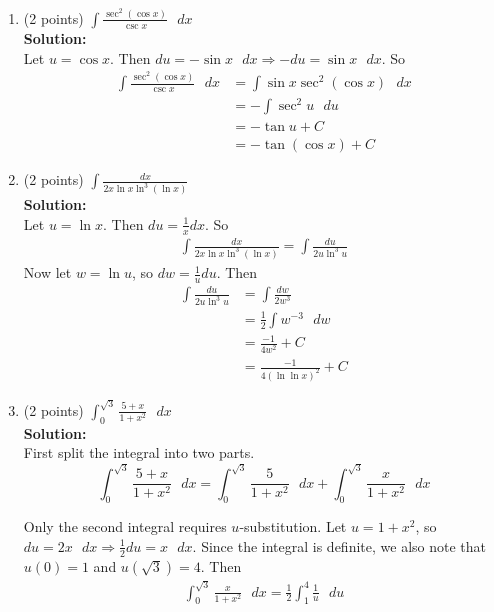 \documentclass[paper=a4, fontsize=11pt]{scrartcl} %
\numberwithin{equation}{section} %
\numberwithin{figure}{section} %
\numberwithin{table}{section} %
\begin{document}
\begin{enumerate}
\item (2 points) $\displaystyle \int \frac{\sec^2(\cos x)}{\csc x} \text{ } dx$\\
\noindent\textbf{Solution:}\\
Let $u = \cos x$.  Then $du = -\sin x \text{ } dx \Longrightarrow -du = \sin x \text{ } dx$.  So
\begin{align*}
\int \frac{\sec^2(\cos x)}{\csc x} \text{ } dx &= \int \sin x\sec^2(\cos x) \text{ } dx\\
&= - \int \sec^2 u \text{ } du\\
&= - \tan u + C\\
&= - \tan(\cos x) + C
\end{align*}
\vspace{1.5in}
\item (2 points) $\displaystyle \int \frac{dx}{2x\ln x \ln^3(\ln x)}$\\
\noindent\textbf{Solution:}\\
Let $u = \ln x$.  Then $du = \frac{1}{x}dx$.  So
\begin{align*}
\int \frac{dx}{2x\ln x \ln^3(\ln x)} = \int \frac{du}{2u\ln^3u}
\end{align*}
Now let $w = \ln u$, so $dw = \frac{1}{u}du$.  Then
\begin{align*}
\int \frac{du}{2u\ln^3u} &= \int \frac{dw}{2w^3}\\
&= \frac{1}{2}\int w^{-3} \text{ } dw\\
&= \frac{-1}{4w^2}+C\\
&= \frac{-1}{4(\ln \ln x)^2} + C
\end{align*}


\newpage

\item (2 points) $\displaystyle \int_0^{\sqrt{3}} \frac{5+x}{1+x^2} \text{ } dx$\\
\noindent\textbf{Solution:}\\
First split the integral into two parts.
\begin{equation*}
\int_0^{\sqrt{3}} \frac{5+x}{1+x^2} \text{ } dx = \int_0^{\sqrt{3}} \frac{5}{1+x^2} \text{ } dx + \int_0^{\sqrt{3}} \frac{x}{1+x^2} \text{ } dx
\end{equation*}

\noindent Only the second integral requires $u$-substitution.  Let $u = 1 + x^2$, so $du = 2x \text{ } dx \Longrightarrow \frac{1}{2}du = x \text{ } dx$.  Since the integral is definite, we also note that $u(0) = 1$ and $u(\sqrt{3}) = 4$. Then
\begin{align*}
\int_0^{\sqrt{3}} \frac{x}{1+x^2} \text{ } dx = \frac{1}{2}\int_1^4  \frac{1}{u}\text{ } du\\
\end{align*}


\end{enumerate}
\end{document}
